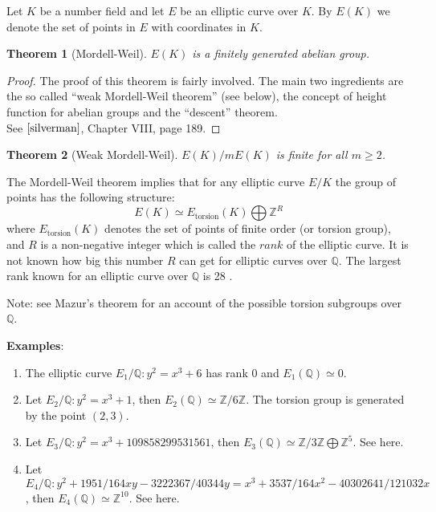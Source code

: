 \documentclass[12pt]{article}
\newtheorem{thm}{Theorem}
\begin{document}
Let $K$ be a number field and let $E$ be an elliptic curve over
$K$. By $E(K)$ we denote the set of points in $E$ with coordinates
in $K$.

\begin{thm}[Mordell-Weil]$E(K)$ is a finitely generated abelian
group.
\end{thm}
\begin{proof}
The proof of this theorem is fairly involved. The
main two ingredients are the so called ``weak Mordell-Weil theorem''
(see below), the concept of height function for abelian groups and
the ``descent'' theorem. \\See $\cite{silverman}$, Chapter VIII, page
189.
\end{proof}

\begin{thm}[Weak Mordell-Weil]$E(K)/mE(K)$ is
finite for all $m\geq 2$.
\end{thm}

The Mordell-Weil theorem implies that for any elliptic curve $E/K$
the group of points has the following structure:
$$E(K)\simeq E_{\operatorname{torsion}}(K)\bigoplus {\mathbb{Z}}^R$$
where $E_{\operatorname{torsion}}(K)$ denotes the set of points of finite order (or torsion group),
and $R$ is a non-negative integer which is called the $rank$ of the
elliptic curve. It is not known how big this number $R$ can get
for elliptic curves over $\mathbb{Q}$. The largest rank known for
an elliptic curve over $\mathbb{Q}$ is 28 .

Note: see Mazur's theorem for an account of the possible torsion subgroups over $\mathbb{Q}$.

{\bf Examples}:
\begin{enumerate}
\item The elliptic curve $E_1/\mathbb{Q}\colon y^2=x^3+6$ has rank 0
and $E_1(\mathbb{Q})\simeq {0}$.

\item Let $E_2/\mathbb{Q}\colon y^2=x^3+1$, then
$E_2(\mathbb{Q})\simeq \mathbb{Z}/6\mathbb{Z}$. The torsion group
is generated by the point $(2,3)$.

\item Let $E_3/\mathbb{Q}\colon y^2=x^3+109858299531561$, then
$E_3(\mathbb{Q})\simeq \mathbb{Z}/3\mathbb{Z}\bigoplus
{\mathbb{Z}}^5$. See
here.

\item Let $E_4/\mathbb{Q}\colon y^2 +1951/164xy
-3222367/40344y=x^3+3537/164x^2-40302641/121032x$, then
$E_4(\mathbb{Q})\simeq {\mathbb{Z}}^{10}$. See
here.
\end{enumerate}
\end{document}
